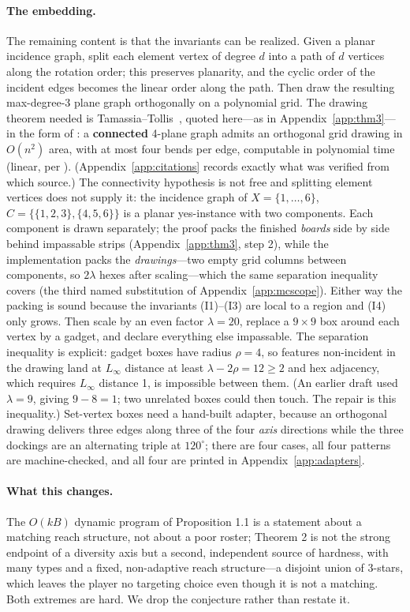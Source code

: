 \documentclass[11pt,a4paper]{article}
\theoremstyle{plain}
\theoremstyle{definition}
\theoremstyle{plain}
\theoremstyle{definition}
\theoremstyle{remark}
\begin{document}
\paragraph{The embedding.} The remaining content is that the invariants can be realized. Given
a planar incidence graph, split each element vertex of degree $d$ into a path of $d$ vertices
along the rotation order; this preserves planarity, and the cyclic order of the incident edges
becomes the linear order along the path. Then draw the resulting max-degree-3 plane graph
orthogonally on a polynomial grid. The drawing theorem needed is Tamassia--Tollis~\cite{TT89},
quoted here---as in Appendix~\ref{app:thm3}---in the form of \cite[Thm.~7.3]{DG13}: a
\textbf{connected} 4-plane graph admits an orthogonal grid drawing in $O(n^2)$ area, with at
most four bends per edge, computable in polynomial time (linear, per \cite{TT89}).
(Appendix~\ref{app:citations} records exactly what was verified from which source.) The connectivity hypothesis is not free and
splitting element vertices does not supply it: the incidence graph of $X=\{1,\dots,6\}$,
$C=\{\{1,2,3\},\{4,5,6\}\}$ is a planar yes-instance with two components. Each component is drawn
separately; the proof packs the finished \emph{boards} side by side behind impassable strips
(Appendix~\ref{app:thm3}, step 2), while the implementation packs the \emph{drawings}---two empty grid
columns between components, so $2\lambda$ hexes after scaling---which the same separation
inequality covers (the third named substitution of Appendix~\ref{app:mcscope}). Either way
the packing is
sound because the invariants (I1)--(I3) are local to a region and
(I4) only grows. Then scale by an even factor $\lambda=20$, replace a
$9\times 9$ box around each vertex by a gadget, and declare everything else impassable. The
separation inequality is explicit: gadget boxes have radius $\rho=4$, so features non-incident
in the drawing land at $L_\infty$ distance at least $\lambda-2\rho=12\ge 2$ and hex adjacency,
which requires $L_\infty$ distance 1, is impossible between them. (An earlier draft used
$\lambda=9$, giving $9-8=1$; two unrelated boxes could then touch. The repair is this
inequality.) Set-vertex boxes need a hand-built adapter, because an orthogonal drawing delivers
three edges along three of the four \emph{axis} directions while the three dockings are an
alternating triple at $120^\circ$; there are four cases, all four patterns are machine-checked,
and all four are printed in Appendix~\ref{app:adapters}.

\paragraph{What this changes.} The $O(kB)$ dynamic program of Proposition 1.1 is a statement
about a matching reach structure, not about a poor roster; Theorem 2 is not the strong endpoint
of a diversity axis but a second, independent source of hardness, with many types and a
fixed, non-adaptive reach structure---a disjoint union of 3-stars, which leaves the player no
targeting choice even though it is not a matching. Both extremes are hard. We drop the conjecture rather than
restate it.
\end{document}
